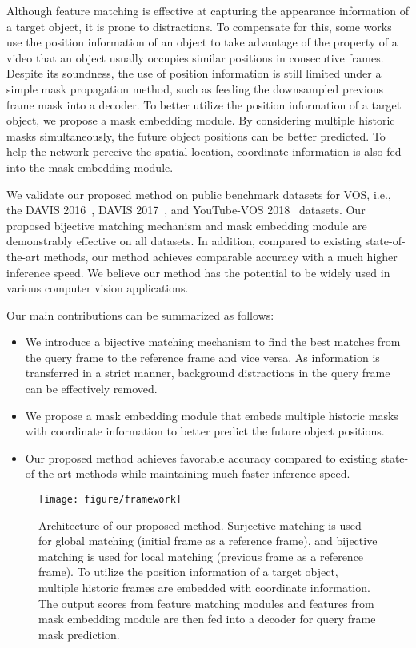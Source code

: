 \documentclass[10pt,twocolumn,letterpaper]{article}
\begin{document}
	
	Although feature matching is effective at capturing the appearance information of a target object, it is prone to distractions. To compensate for this, some works~\cite{RGMP, FEELVOS, A-GAME} use the position information of an object to take advantage of the property of a video that an object usually occupies similar positions in consecutive frames. Despite its soundness, the use of position information is still limited under a simple mask propagation method, such as feeding the downsampled previous frame mask into a decoder. To better utilize the position information of a target object, we propose a mask embedding module. By considering multiple historic masks simultaneously, the future object positions can be better predicted. To help the network perceive the spatial location, coordinate information is also fed into the mask embedding module.  
	
	
	We validate our proposed method on public benchmark datasets for VOS, i.e., the DAVIS 2016~\cite{DAVIS2016}, DAVIS 2017~\cite{DAVIS2017}, and YouTube-VOS 2018~\cite{YTVOS} datasets. Our proposed bijective matching mechanism and mask embedding module are demonstrably effective on all datasets. In addition, compared to existing state-of-the-art methods, our method achieves comparable accuracy with a much higher inference speed. We believe our method has the potential to be widely used in various computer vision applications.
	
	
	Our main contributions can be summarized as follows:
	\begin{itemize}[leftmargin=0.2in]
		\item We introduce a bijective matching mechanism to find the best matches from the query frame to the reference frame and vice versa. As information is transferred in a strict manner, background distractions in the query frame can be effectively removed. 
		
		\item We propose a mask embedding module that embeds multiple historic masks with coordinate information to better predict the future object positions.
		
		\item Our proposed method achieves favorable accuracy compared to existing state-of-the-art methods while maintaining much faster inference speed.
	\end{itemize} 
	
	
	\begin{figure*}[t]
		\centering
		\texttt{[image: figure/framework]}
		\caption{Architecture of our proposed method. Surjective matching is used for global matching (initial frame as a reference frame), and bijective matching is used for local matching (previous frame as a reference frame). To utilize the position information of a target object, multiple historic frames are embedded with coordinate information. The output scores from feature matching modules and features from mask embedding module are then fed into a decoder for query frame mask prediction.}
		\label{figure2}
	\end{figure*}
	
\end{document}
